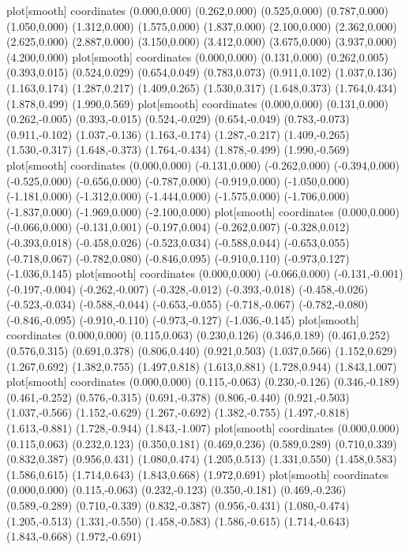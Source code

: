 plot[smooth] coordinates {(0.000,0.000) (0.262,0.000) (0.525,0.000) (0.787,0.000) (1.050,0.000) (1.312,0.000) (1.575,0.000) (1.837,0.000) (2.100,0.000) (2.362,0.000) (2.625,0.000) (2.887,0.000) (3.150,0.000) (3.412,0.000) (3.675,0.000) (3.937,0.000) (4.200,0.000)}
plot[smooth] coordinates {(0.000,0.000) (0.131,0.000) (0.262,0.005) (0.393,0.015) (0.524,0.029) (0.654,0.049) (0.783,0.073) (0.911,0.102) (1.037,0.136) (1.163,0.174) (1.287,0.217) (1.409,0.265) (1.530,0.317) (1.648,0.373) (1.764,0.434) (1.878,0.499) (1.990,0.569)}
plot[smooth] coordinates {(0.000,0.000) (0.131,0.000) (0.262,-0.005) (0.393,-0.015) (0.524,-0.029) (0.654,-0.049) (0.783,-0.073) (0.911,-0.102) (1.037,-0.136) (1.163,-0.174) (1.287,-0.217) (1.409,-0.265) (1.530,-0.317) (1.648,-0.373) (1.764,-0.434) (1.878,-0.499) (1.990,-0.569)}
plot[smooth] coordinates {(0.000,0.000) (-0.131,0.000) (-0.262,0.000) (-0.394,0.000) (-0.525,0.000) (-0.656,0.000) (-0.787,0.000) (-0.919,0.000) (-1.050,0.000) (-1.181,0.000) (-1.312,0.000) (-1.444,0.000) (-1.575,0.000) (-1.706,0.000) (-1.837,0.000) (-1.969,0.000) (-2.100,0.000)}
plot[smooth] coordinates {(0.000,0.000) (-0.066,0.000) (-0.131,0.001) (-0.197,0.004) (-0.262,0.007) (-0.328,0.012) (-0.393,0.018) (-0.458,0.026) (-0.523,0.034) (-0.588,0.044) (-0.653,0.055) (-0.718,0.067) (-0.782,0.080) (-0.846,0.095) (-0.910,0.110) (-0.973,0.127) (-1.036,0.145)}
plot[smooth] coordinates {(0.000,0.000) (-0.066,0.000) (-0.131,-0.001) (-0.197,-0.004) (-0.262,-0.007) (-0.328,-0.012) (-0.393,-0.018) (-0.458,-0.026) (-0.523,-0.034) (-0.588,-0.044) (-0.653,-0.055) (-0.718,-0.067) (-0.782,-0.080) (-0.846,-0.095) (-0.910,-0.110) (-0.973,-0.127) (-1.036,-0.145)}
plot[smooth] coordinates {(0.000,0.000) (0.115,0.063) (0.230,0.126) (0.346,0.189) (0.461,0.252) (0.576,0.315) (0.691,0.378) (0.806,0.440) (0.921,0.503) (1.037,0.566) (1.152,0.629) (1.267,0.692) (1.382,0.755) (1.497,0.818) (1.613,0.881) (1.728,0.944) (1.843,1.007)}
plot[smooth] coordinates {(0.000,0.000) (0.115,-0.063) (0.230,-0.126) (0.346,-0.189) (0.461,-0.252) (0.576,-0.315) (0.691,-0.378) (0.806,-0.440) (0.921,-0.503) (1.037,-0.566) (1.152,-0.629) (1.267,-0.692) (1.382,-0.755) (1.497,-0.818) (1.613,-0.881) (1.728,-0.944) (1.843,-1.007)}
plot[smooth] coordinates {(0.000,0.000) (0.115,0.063) (0.232,0.123) (0.350,0.181) (0.469,0.236) (0.589,0.289) (0.710,0.339) (0.832,0.387) (0.956,0.431) (1.080,0.474) (1.205,0.513) (1.331,0.550) (1.458,0.583) (1.586,0.615) (1.714,0.643) (1.843,0.668) (1.972,0.691)}
plot[smooth] coordinates {(0.000,0.000) (0.115,-0.063) (0.232,-0.123) (0.350,-0.181) (0.469,-0.236) (0.589,-0.289) (0.710,-0.339) (0.832,-0.387) (0.956,-0.431) (1.080,-0.474) (1.205,-0.513) (1.331,-0.550) (1.458,-0.583) (1.586,-0.615) (1.714,-0.643) (1.843,-0.668) (1.972,-0.691)}

